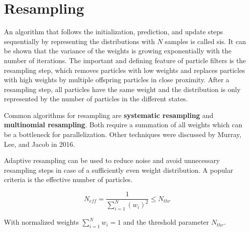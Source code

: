 \section{Resampling}
\label{sec:pf_resampling}

An algorithm that follows the initialization, prediction, and update steps sequentially by representing the distributions with $N$ samples is called \gls{sis}. It can be shown that the variance of the weights is growing exponentially with the number of iterations. The important and defining feature of particle filters is the resampling step, which removes particles with low weights and replaces particles with high weights by multiple offspring particles in close proximity. After a resampling step, all particles have the same weight and the distribution is only represented by the number of particles in the different states.\cite{Doucet2011}

Common algorithms for resampling are \textbf{systematic resampling} and \textbf{multinomial resampling}. Both require a summation of all weights which can be a bottleneck for parallelization. Other techniques were discussed by Murray, Lee, and Jacob in 2016.\cite{Doucet2011}\cite{parallel_resampling}

Adaptive resampling can be used to reduce noise and avoid unnecessary resampling steps in case of a sufficiently even weight distribution. A popular criteria is the effective number of particles.

\begin{equation}
\label{eq:pf_effective}
    {\hat{N}}_{\mathit{eff}} = \frac{1}{\sum_{i=1}^N\left(w_i\right)^2} \leq N_\mathit{thr}
\end{equation}

With normalized weights \(\sum_{i=1}^N{w_i} = 1\) and the threshold parameter $N_\mathit{thr}$.\cite{Moral2012}
